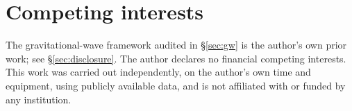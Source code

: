 \documentclass[11pt,a4paper]{article}
\begin{document}
\section*{Competing interests}

The gravitational-wave framework audited in \S\ref{sec:gw} is the author's own
prior work; see \S\ref{sec:disclosure}. The author declares no financial
competing interests. This work was carried out independently, on the author's
own time and equipment, using publicly available data, and is not affiliated
with or funded by any institution.



\end{document}
